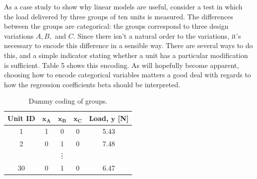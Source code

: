 \documentclass[11pt,a4paper,article]{memoir} %
\begin{document}
As a case study to show why linear models are useful, consider a test in which the load delivered by three groups of ten units is measured. The differences between the groups are categorical: the groups correspond to three design variations $A, B,$ and $C$. Since there isn't a natural order to the variations, it's necessary to encode this difference in a sensible way. There are several ways to do this, and a simple indicator stating whether a unit has a particular modification is sufficient. Table 5 shows this encoding. As will hopefully become apparent, choosing how to encode categorical variables matters a good deal with regards to how the regression coefficients beta should be interpreted.
\begin{table}
\centering
\caption{Dummy coding of groups.}
\small
\begin{tabular}{c c c c c}
\toprule
\textbf{Unit ID}                 & $\mathbf{x_A}$ & $\mathbf{x_B}$ & $\mathbf{x_C}$ & \textbf{Load, $\mathbf{y}$ [N]} \\
\midrule
1                       & 1 & 0 & 0 & 5.43         \\
2                       & 0 & 1 & 0 & 7.48         \\ 
& & \vdots & & \\
30 & 0 & 1 & 0 & 6.47 \\
\bottomrule
\end{tabular}
\end{table}
\end{document}
